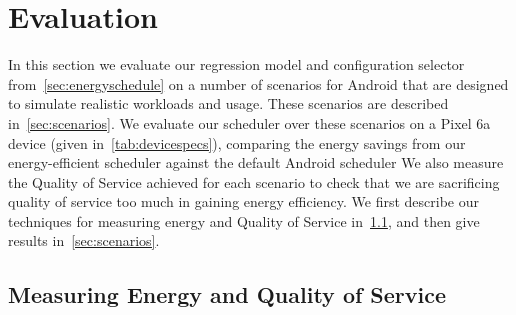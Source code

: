 \documentclass[conference]{IEEEtran}
\begin{document}

\section{Evaluation}


In this section we evaluate our regression model and configuration selector from~\cref{sec:energyschedule} on a number of scenarios for Android that are designed to simulate realistic workloads and usage. These scenarios are described in~\cref{sec:scenarios}. We evaluate our scheduler over these scenarios on a Pixel 6a device (given in~\cref{tab:devicespecs}), comparing the energy savings from our energy-efficient scheduler against the default Android scheduler%
We also measure the Quality of Service achieved for each scenario to check that we are sacrificing quality of service too much in gaining energy efficiency. We first describe our techniques for measuring energy and Quality of Service in~\cref{sec:measureeneryqos}, and then give results in~\cref{sec:scenarios}.


\subsection{Measuring Energy and Quality of Service} \label{sec:measureeneryqos}
\end{document}
